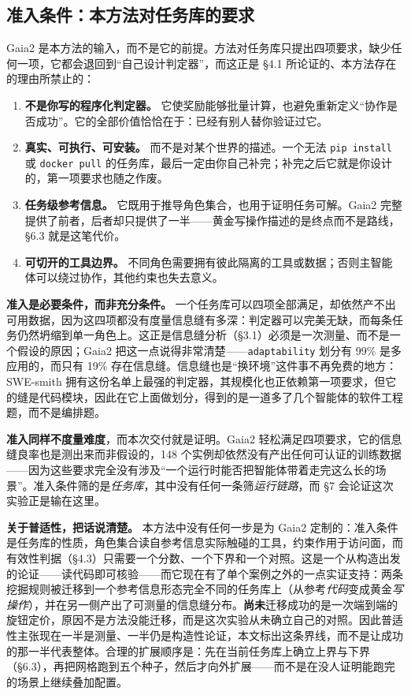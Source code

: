 \documentclass[UTF8,11pt,fontset=fandol]{ctexart}
\begin{document}
\subsection{准入条件：本方法对任务库的要求}
\label{sec:substrate}

Gaia2 是本方法的输入，而不是它的前提。方法对任务库只提出四项要求，缺少任何一项，它都会退回到“自己设计判定器”，而这正是 \S4.1 所论证的、本方法存在的理由所禁止的：

\begin{enumerate}
\setlength{\itemsep}{0.15em}
\item \textbf{不是你写的程序化判定器。} 它使奖励能够批量计算，也避免重新定义“协作是否成功”。它的全部价值恰恰在于：已经有别人替你验证过它。
\item \textbf{真实、可执行、可安装。} 而不是对某个世界的描述。一个无法 \texttt{pip install} 或 \texttt{docker pull} 的任务库，最后一定由你自己补完；补完之后它就是你设计的，第一项要求也随之作废。
\item \textbf{任务级参考信息。} 它既用于推导角色集合，也用于证明任务可解。Gaia2 完整提供了前者，后者却只提供了一半——黄金写操作描述的是终点而不是路线，\S6.3 就是这笔代价。
\item \textbf{可切开的工具边界。} 不同角色需要拥有彼此隔离的工具或数据；否则主智能体可以绕过协作，其他约束也失去意义。
\end{enumerate}

\textbf{准入是必要条件，而非充分条件。} 一个任务库可以四项全部满足，却依然产不出可用数据，因为这四项都没有度量信息缝有多深：判定器可以完美无缺，而每条任务仍然坍缩到单一角色上。这正是信息缝分析（\S3.1）必须是一次测量、而不是一个假设的原因；Gaia2 把这一点说得非常清楚——\texttt{adaptability} 划分有 99\% 是多应用的，而只有 19\% 存在信息缝。信息缝也是“换环境”这件事不再免费的地方：SWE-smith 拥有这份名单上最强的判定器，其规模化也正依赖第一项要求\cite{yang2025swesmith}，但它的缝是代码模块，因此在它上面做划分，得到的是一道多了几个智能体的软件工程题，而不是编排题。

\textbf{准入同样不度量难度}，而本次交付就是证明。Gaia2 轻松满足四项要求，它的信息缝良率也是测出来而非假设的，148 个实例却依然没有产出任何可认证的训练数据——因为这些要求完全没有涉及“一个运行时能否把智能体带着走完这么长的场景”。准入条件筛的是\emph{任务库}，其中没有任何一条筛\emph{运行链路}，而 \S7 会论证这次实验正是输在这里。

\textbf{关于普适性，把话说清楚。} 本方法中没有任何一步是为 Gaia2 定制的：准入条件是任务库的性质，角色集合读自参考信息实际触碰的工具，约束作用于访问面，而有效性判据（\S4.3）只需要一个分数、一个下界和一个对照。这是一个从构造出发的论证——读代码即可核验——而它现在有了单个案例之外的一点实证支持：两条挖掘规则被迁移到一个参考信息形态完全不同的任务库上（从参考\emph{代码}变成黄金\emph{写操作}），并在另一侧产出了可测量的信息缝分布。\textbf{尚未}迁移成功的是一次端到端的旋钮定价，原因不是方法没能迁移，而是这次实验从未确立自己的对照。因此普适性主张现在一半是测量、一半仍是构造性论证，本文标出这条界线，而不是让成功的那一半代表整体。合理的扩展顺序是：先在当前任务库上确立上界与下界（\S6.3），再把网格跑到五个种子，然后才向外扩展——而不是在没人证明能跑完的场景上继续叠加配置。
\end{document}
